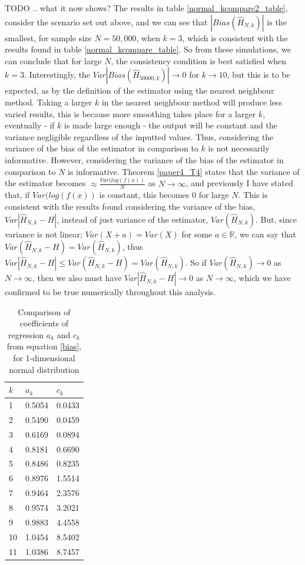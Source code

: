 \documentclass{report}
\begin{document}
TODO .. what it now shows?
The results in table \ref{normal_kcompare2_table}, consider the scenario set out above, and we can see that $|Bias(\hat{H}_{N, k})|$ is the smallest, for sample size $N=50,000$, when $k=3$, which is consistent with the results found in table \ref{normal_kcompare_table}. So from these simulations, we can conclude that for large $N$, the consistency condition is best satisfied when $k=3$. 
Interestingly, the $Var|Bias(\hat{H}_{50000, k})| \to 0$ for $k \to 10$, but this is to be expected, as by the definition of the estimator using the nearest neighbour method. Taking a larger $k$ in the nearest neighbour method will produce less varied results, this is because more smoothing takes place for a larger $k$, eventually - if $k$ is made large enough - the output will be constant and the variance negligible regardless of the inputted values. Thus, considering the variance of the bias of the estimator in comparison to $k$ is not necessarily informative. 
However, considering the variance of the bias of the estimator in comparison to $N$ is informative. Theorem \ref{paper4_T4} states that the variance of the estimator becomes $\approx \frac{Var(log(f(x))}{N}$ as $N \to \infty$, and previously I have stated that, if $Var(log(f(x))$ is constant, this becomes 0 for large $N$. This is consistent with the results found considering the variance of the bias, $Var|\hat{H}_{N, k} - H|$, instead of just variance of the estimator, $Var(\hat{H}_{N, k})$. But, since variance is not linear; $Var(X+a)=Var(X)$ for some $a \in \mathbb{R}$, we can say that $Var(\hat{H}_{N, k} - H) = Var(\hat{H}_{N, k})$, thus  $Var|\hat{H}_{N, k} - H| \leq Var(\hat{H}_{N, k} - H) = Var(\hat{H}_{N, k})$. So if $Var(\hat{H}_{N, k}) \to 0$ as $N \to \infty$, then we also must have $Var|\hat{H}_{N, k} - H| \to 0$ as $N \to \infty$, which we have confirmed to be true numerically throughout this analysis.

\begin{table}
\caption{Comparison of coefficients of regression $a_{k}$ and $c_{k}$ from equation \ref{bias}, for 1-dimensional normal distribution} \label{normal_a_c_compare_table}
\begin{center}
\begin{tabular}{| l | l l |} 
\toprule
$k$ &  $a_{k}$ & $c_{k}$ \\
\midrule[1pt]
1  &  0.5054 & 0.0433 \\
2  & 0.5490 & 0.0459 \\
3  & 0.6169 & 0.0894 \\
4  & 0.8181 & 0.6690 \\
5  & 0.8486 & 0.8235 \\
6  & 0.8976 & 1.5514 \\
7  & 0.9464 & 2.3576 \\
8  & 0.9574 & 3.2021 \\
9  & 0.9883 & 4.4558 \\
10 & 1.0454 & 8.5402 \\
11 & 1.0386 & 8.7457 \\
\hline
\end{tabular}
\\[10pt]
\end{center}
\end{table}
\end{document}
